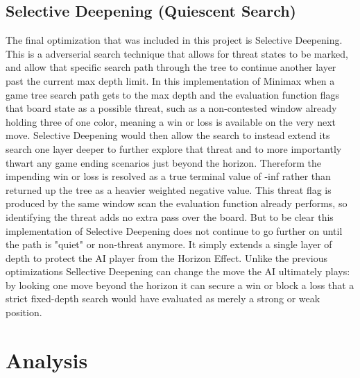 \documentclass[conference]{IEEEtran}
\begin{document}
\subsection{Selective Deepening (Quiescent Search)}
The final optimization that was included in this project is Selective Deepening. This is a adverserial search technique that allows for threat states to be marked, and allow that specific search path through the tree to continue another layer past the current max depth limit. In this implementation of Minimax when a game tree search path gets to the max depth and the evaluation function flags that board state as a possible threat, such as a non-contested window already holding three of one color, meaning a win or loss is available on the very next move. Selective Deepening would then allow the search to instead extend its search one layer deeper to further explore that threat and to more importantly thwart any game ending scenarios just beyond the horizon. Thereform  the impending win or loss is resolved as a true terminal value of -inf rather than returned up the tree as a heavier weighted negative value. This threat flag is produced by the same window scan the evaluation function already performs, so identifying the threat adds no extra pass over the board. But to be clear this implementation of Selective Deepening does not continue to go further on until the path is "quiet" or non-threat anymore. It simply extends a single layer of depth to protect the AI player from the Horizon Effect. Unlike the previous optimizations Sellective Deepening can change the move the AI ultimately plays: by looking one move beyond the horizon it can secure a win or block a loss that a strict fixed-depth search would have evaluated as merely a strong or weak position. 


\onecolumn
\section{Analysis}
\end{document}
